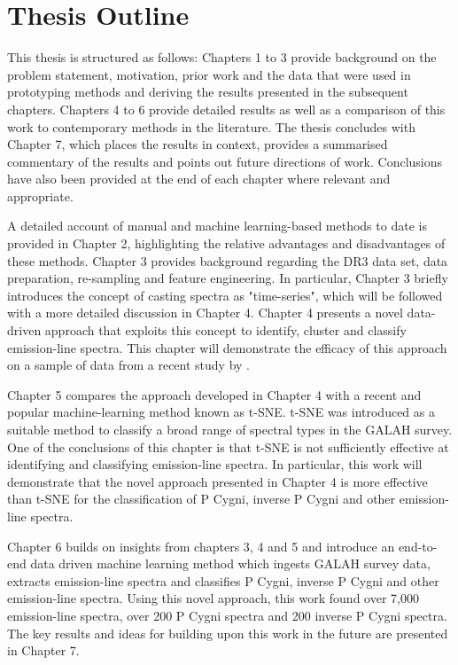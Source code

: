 \section{Thesis Outline}

This thesis is structured as follows: Chapters 1 to 3 provide background on the problem statement, motivation, prior work and the data that were used in prototyping methods and deriving the results presented in the subsequent chapters. Chapters 4 to 6 provide detailed results as well as a comparison of this work to contemporary methods in the literature. The thesis concludes with Chapter 7, which places the results in context, provides a summarised commentary of the results and points out future directions of work. Conclusions have also been provided at the end of each chapter where relevant and appropriate. 

A detailed account of manual and machine learning-based methods to date is provided in Chapter 2, highlighting the relative advantages and disadvantages of these methods. Chapter 3 provides background regarding the DR3 data set, data preparation, re-sampling and feature engineering. In particular, Chapter 3 briefly introduces the concept of casting spectra as "time-series", which will be followed with a more detailed discussion in Chapter 4. Chapter 4 presents a novel data-driven approach that exploits this concept to identify, cluster and classify emission-line spectra. This chapter will demonstrate the efficacy of this approach on a sample of data from a recent study by \citet{vcotar2021galah}. 

Chapter 5 compares the approach developed in Chapter 4 with a recent and popular machine-learning method known as t-SNE. t-SNE was introduced as a suitable method to classify a broad range of spectral types in the GALAH survey. One of the conclusions of this chapter is that t-SNE is not sufficiently effective at identifying and classifying emission-line spectra. In particular, this work will demonstrate that the novel approach presented in Chapter 4 is more effective than t-SNE for the classification of P Cygni, inverse P Cygni and other emission-line spectra.

Chapter 6 builds on insights from chapters 3, 4 and 5 and introduce an end-to-end data driven machine learning method which ingests GALAH survey data, extracts emission-line spectra and classifies P Cygni, inverse P Cygni and other emission-line spectra. Using this novel approach, this work found over 7,000 emission-line spectra, over 200 P Cygni spectra and 200 inverse P Cygni spectra. The key results and ideas for building upon this work in the future are presented in Chapter 7.

